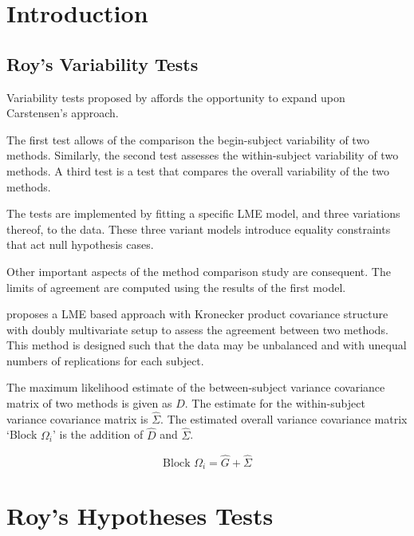 \documentclass[12pt, a4paper]{report}
\theoremstyle{plain}
\theoremstyle{definition}
\theoremstyle{remark}
\begin{document}
	
	

	\section{Introduction}
	


\subsection{Roy's Variability Tests}
	Variability tests proposed by \citet{ARoy2009} affords the opportunity to expand upon Carstensen's approach.
	
	The first test allows of the comparison the begin-subject variability of two methods. Similarly, the second test
	assesses the within-subject variability of two methods. A third test is a test that compares the overall variability of the two methods.
	
	The tests are implemented by fitting a specific LME model, and three variations thereof, to the data. These three variant models introduce equality constraints that act null hypothesis cases.
	
	Other important aspects of the method comparison study are consequent. The limits of agreement are computed using the results of the first model.

	
	\citet{ARoy2009} proposes a LME based approach with Kronecker
	product covariance structure with doubly multivariate setup to
	assess the agreement between two methods. This method is designed
	such that the data may be unbalanced and with unequal numbers of
	replications for each subject.
	
	The maximum likelihood estimate of the between-subject variance
	covariance matrix of two methods is given as $D$. The estimate for
	the within-subject variance covariance matrix is $\hat{\Sigma}$.
	The estimated overall variance covariance matrix `Block
	$\Omega_{i}$' is the addition of $\hat{D}$ and $\hat{\Sigma}$.
	
	
	\begin{equation}
	\mbox{Block  }\Omega_{i} = \hat{G} + \hat{\Sigma}
	\end{equation}

	

	





		
	\section{Roy's Hypotheses Tests}
	
\end{document}
